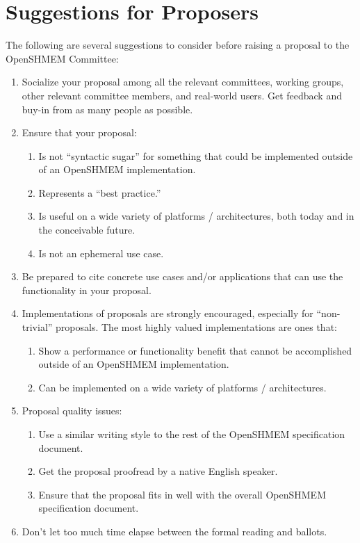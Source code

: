\chapter{Suggestions for Proposers}

The following are several suggestions to consider before raising a
proposal to the OpenSHMEM Committee:

\begin{enumerate}
\item Socialize your proposal among all the relevant 
  committees, working groups, other relevant committee members, and real-world users.  Get
  feedback and buy-in from as many people as possible.

\item Ensure that your proposal:
  \begin{enumerate}
  \item Is not ``syntactic sugar'' for something that could be
    implemented outside of an OpenSHMEM implementation.
  \item Represents a ``best practice.''
  \item Is useful on a wide variety of platforms / architectures, both
    today and in the conceivable future.
  \item Is not an ephemeral use case.
  \end{enumerate}

\item Be prepared to cite concrete use cases and/or applications that
  can use the functionality in your proposal.

\item Implementations of proposals are strongly encouraged, especially
  for ``non-trivial'' proposals.  The most highly valued
  implementations are ones that:
  \begin{enumerate}
  \item Show a performance or functionality benefit that cannot be
    accomplished outside of an OpenSHMEM implementation.
  \item Can be implemented on a wide variety of platforms /
    architectures.
  \end{enumerate}

\item Proposal quality issues:
  \begin{enumerate}
  \item Use a similar writing style to the rest of the OpenSHMEM
    specification document.
  \item Get the proposal proofread by a native English speaker.
  \item Ensure that the proposal fits in well with the overall OpenSHMEM
    specification document.
  \end{enumerate}

\item Don't let too much time elapse between the formal reading and
  ballots.

\end{enumerate}
